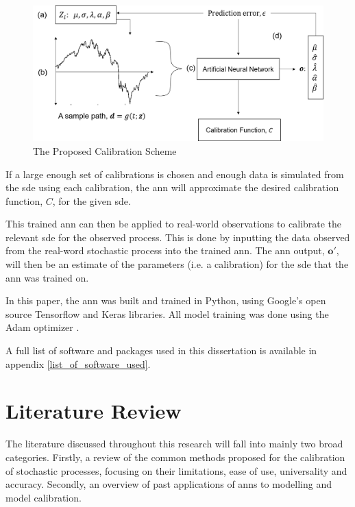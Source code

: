 \documentclass[11pt,oneside,openany,a4paper,english, report, goldenblock
]{usthesis}
\begin{document}
\begin{figure}[h]
	\centering
	\includegraphics[width=1\linewidth]{Images/Diagrams/CalibrationSchemeDiagram}
	\caption[The Proposed Calibration Scheme]{The Proposed Calibration Scheme}
	\label{fig:calibrationschemediagram}
\end{figure}

If a large enough set of calibrations is chosen and enough data is simulated from the \acrshort{sde} using each calibration, the \acrshort{ann} will approximate the desired calibration function, $C$, for the given \acrshort{sde}.


This trained \acrshort{ann} can then be applied to real-world observations to calibrate the relevant \acrshort{sde} for the observed process.  This is done by inputting the data observed from the real-word stochastic process into the trained \acrshort{ann}. The \acrshort{ann} output, $\mathbf{o'}$, will then be an estimate of the parameters (i.e. a calibration) for the \acrshort{sde} that the \acrshort{ann} was trained on.


In this paper, the \acrshort{ann} was built and trained in Python, using Google's open source Tensorflow\texttrademark \xspace \citep{tensorflow2015-whitepaper} and Keras \citep{chollet2015keras} libraries. All model training was done using the Adam optimizer \citep{adam}.

A full list of software and packages used in this dissertation is available in appendix \ref{list_of_software_used}.

\chapter{Literature Review}
\label{chapter:literature_review}
The literature discussed throughout this research will fall into mainly two broad categories. Firstly, a review of the common methods proposed for the calibration of stochastic processes, focusing on their limitations, ease of use, universality and accuracy. Secondly, an overview of past applications of \acrshort{ann}s to modelling and model calibration. 
\end{document}
